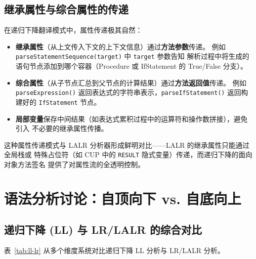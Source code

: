 \documentclass[a4paper]{article}
\begin{document}
\subsection{继承属性与综合属性的传递}

在递归下降翻译模式中，属性传递极其自然：

\begin{itemize}
    \item \textbf{继承属性}（从上文传入下文的上下文信息）通过\textbf{方法参数}传递。
          例如 \texttt{parseStatementSequence(target)} 中 \texttt{target} 参数告知
          解析过程中将生成的语句节点添加到哪个容器（Procedure 或 IfStatement 的 True/False 分支）。
    \item \textbf{综合属性}（从子节点汇总到父节点的计算结果）通过\textbf{方法返回值}传递。
          例如 \texttt{parseExpression()} 返回表达式的字符串表示，\texttt{parseIfStatement()}
          返回构建好的 \texttt{IfStatement} 节点。
    \item \textbf{局部变量}保存中间结果（如表达式累积过程中的运算符和操作数拼接），避免引入
          不必要的继承属性传播。
\end{itemize}

这种属性传递模式与 LALR 分析器形成鲜明对比——LALR 的继承属性只能通过全局栈或
特殊占位符（如 CUP 中的 \texttt{RESULT} 隐式变量）传递，而递归下降的面向对象方法签名
提供了对属性流的全透明控制。

\section{语法分析讨论：自顶向下 vs. 自底向上}

\subsection{递归下降 (LL) 与 LR/LALR 的综合对比}

表~\ref{tab:ll-lr} 从多个维度系统对比递归下降 LL 分析与 LR/LALR 分析。
\end{document}
